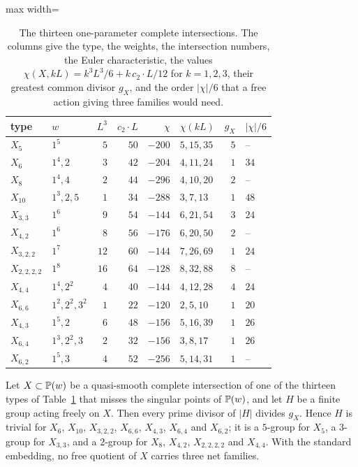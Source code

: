\begin{table}[t]
\caption{The thirteen one-parameter complete intersections. The columns
give the type, the weights, the intersection numbers, the Euler
characteristic, the values $\chi(X,kL)=k^3L^3/6+k\,c_2\cdot L/12$ for
$k=1,2,3$, their greatest common divisor $g_X$, and the order $|\chi|/6$
that a free action giving three families would need.}
\label{tab:freequot}
\centering
\begin{adjustbox}{max width=\linewidth}\begin{tabular}{llrrrlrl}
\toprule
type & $w$ & $L^3$ & $c_2\cdot L$ & $\chi$ & $\chi(kL)$ & $g_X$ & $|\chi|/6$\\
\midrule
$X_5$ & $1^5$ & $5$ & $50$ & $-200$ & $5,15,35$ & $5$ & --\\
$X_6$ & $1^4,2$ & $3$ & $42$ & $-204$ & $4,11,24$ & $1$ & $34$\\
$X_8$ & $1^4,4$ & $2$ & $44$ & $-296$ & $4,10,20$ & $2$ & --\\
$X_{10}$ & $1^3,2,5$ & $1$ & $34$ & $-288$ & $3,7,13$ & $1$ & $48$\\
$X_{3,3}$ & $1^6$ & $9$ & $54$ & $-144$ & $6,21,54$ & $3$ & $24$\\
$X_{4,2}$ & $1^6$ & $8$ & $56$ & $-176$ & $6,20,50$ & $2$ & --\\
$X_{3,2,2}$ & $1^7$ & $12$ & $60$ & $-144$ & $7,26,69$ & $1$ & $24$\\
$X_{2,2,2,2}$ & $1^8$ & $16$ & $64$ & $-128$ & $8,32,88$ & $8$ & --\\
$X_{4,4}$ & $1^4,2^2$ & $4$ & $40$ & $-144$ & $4,12,28$ & $4$ & $24$\\
$X_{6,6}$ & $1^2,2^2,3^2$ & $1$ & $22$ & $-120$ & $2,5,10$ & $1$ & $20$\\
$X_{4,3}$ & $1^5,2$ & $6$ & $48$ & $-156$ & $5,16,39$ & $1$ & $26$\\
$X_{6,4}$ & $1^3,2^2,3$ & $2$ & $32$ & $-156$ & $3,8,17$ & $1$ & $26$\\
$X_{6,2}$ & $1^5,3$ & $4$ & $52$ & $-256$ & $5,14,31$ & $1$ & --\\
\bottomrule
\end{tabular}\end{adjustbox}
\end{table}

\begin{proposition}\label{prop:freequot}
Let $X\subset\mathbb{P}(w)$ be a quasi-smooth complete intersection of one of the
thirteen types of Table~\ref{tab:freequot} that misses the singular points
of $\mathbb{P}(w)$, and let $H$ be a finite group acting freely on $X$. Then every
prime divisor of $|H|$ divides $g_X$. Hence $H$ is trivial for $X_6$,
$X_{10}$, $X_{3,2,2}$, $X_{6,6}$, $X_{4,3}$, $X_{6,4}$ and $X_{6,2}$; it is
a $5$-group for $X_5$, a $3$-group for $X_{3,3}$, and a $2$-group for
$X_8$, $X_{4,2}$, $X_{2,2,2,2}$ and $X_{4,4}$. With the standard embedding,
no free quotient of $X$ carries three net families.
\end{proposition}

